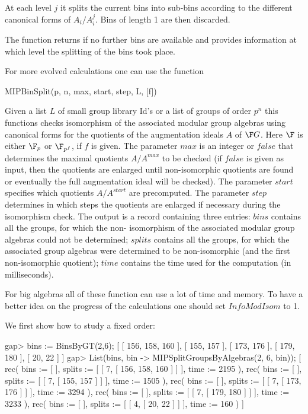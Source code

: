 At each level $j$ it splits the current bins into sub-bins according 
to the different canonical forms of $A_i/A_i^j$. Bins of length 1 are 
then discarded.

The function returns if no further bins are available and provides
information at which level the splitting of the bins took place.

For more evolved calculations one can use the function

\> MIPBinSplit(p, n, max, start, step, L, [f])

Given a list $L$ of small group library Id's or a list of groups of order $p^n$ this functions checks
isomorphism of the associated modular group algebras using canonical forms for the quotients of the
augmentation ideals $A$ of $\F G$. Here $\F$ is either $\F_p$ or $\F_{p^f}$, if $f$ is given.
The parameter $max$ is an integer or $false$ that determines the maximal
quotients $A/A^{max}$ to be checked (if $false$ is given as input, then the quotients are enlarged
until non-isomorphic quotients are found or eventually the full augmentation ideal will be checked).
The parameter $start$ specifies which quotients $A/A^{start}$ are precomputed. The parameter
$step$ determines in which steps the quotients are enlarged if necessary during the isomorphism check.
The output is a record containing three entries: $bins$ contains all the groups, for which the non-
isomorphism of the associated modular group algebras could not be determined; $splits$ contains all
the groups, for which the associated group algebras were determined to be non-isomorphic (and the
first non-isomorphic quotient); $time$ contains the time used for the computation (in milliseconds).

For big algebras all of these function can use a lot of time and memory. To have a
better idea on the progress of the calculations one should set $InfoModIsom$ to 1.

We first show how to study a fixed order:

\beginexample
gap> bins := BinsByGT(2,6);
[ [ 156, 158, 160 ], [ 155, 157 ], [ 173, 176 ], [ 179, 180 ], [ 20, 22 ] ]
gap> List(bins, bin -> MIPSplitGroupsByAlgebras(2, 6, bin));
[ rec( bins := [  ], splits := [ [ 7, [ 156, 158, 160 ] ] ], time := 2195 ), 
  rec( bins := [  ], splits := [ [ 7, [ 155, 157 ] ] ], time := 1505 ), 
  rec( bins := [  ], splits := [ [ 7, [ 173, 176 ] ] ], time := 3294 ), 
  rec( bins := [  ], splits := [ [ 7, [ 179, 180 ] ] ], time := 3233 ), 
  rec( bins := [  ], splits := [ [ 4, [ 20, 22 ] ] ], time := 160 ) ]
\endexample

